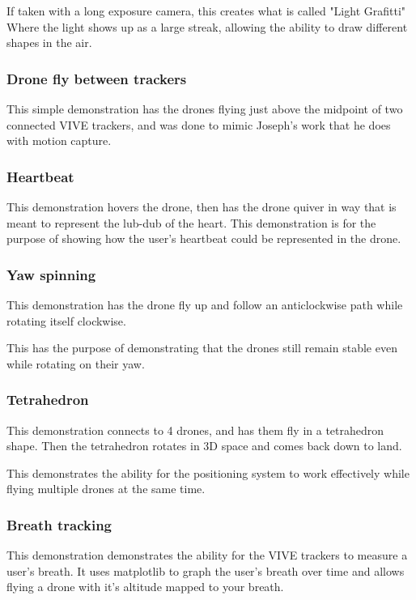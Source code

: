 \documentclass{article}
\begin{document}
  If taken with a long exposure camera, this creates what is called "Light Grafitti"
  Where the light shows up as a large streak, allowing the ability to draw different
  shapes in the air.

  \subsubsection{Drone fly between trackers}
  This simple demonstration has the drones flying just above the midpoint of two
  connected VIVE trackers, and was done to mimic Joseph's work that he does with
  motion capture.

  \subsubsection{Heartbeat}
  This demonstration hovers the drone, then has the drone quiver in way that 
  is meant to represent the lub-dub of the heart. This demonstration is for
  the purpose of showing how the user's heartbeat could be represented in the
  drone.

  \subsubsection{Yaw spinning}
  This demonstration has the drone fly up and follow an anticlockwise path
  while rotating itself clockwise.

  This has the purpose of demonstrating that the drones still remain stable
  even while rotating on their yaw.

  \subsubsection{Tetrahedron}
  This demonstration connects to 4 drones, and has them fly in a tetrahedron
  shape. Then the tetrahedron rotates in 3D space and comes back down to land.

  This demonstrates the ability for the positioning system to work effectively
  while flying multiple drones at the same time.

  \subsubsection{Breath tracking}
  This demonstration demonstrates the ability for the VIVE trackers to measure
  a user's breath. It uses matplotlib to graph the user's breath over time and
  allows flying a drone with it's altitude mapped to your breath.
\end{document}
